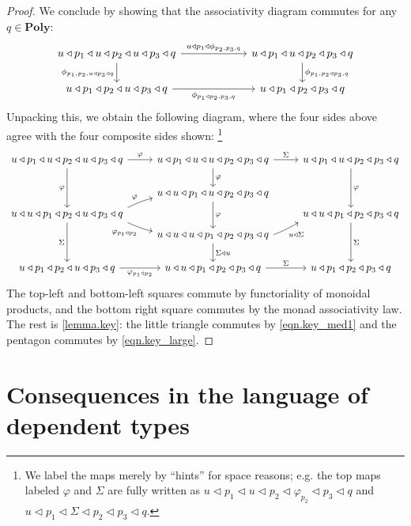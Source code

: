 \documentclass[11pt, one side, article]{memoir}
\theoremstyle{definition}
\theoremstyle{plain}
\newcommand{\Cat}[1]{\mathbf{#1}}%
\newcommand{\poly}{\Cat{Poly}}
\newcommand{\0}{\textsf{0}}
\newcommand{\1}{\tn{\textsf{1}}}
\newcommand{\tri}{\mathbin{\triangleleft}}
\begin{document}
\begin{proof}
We conclude by showing that the associativity diagram commutes for any $q\in\poly$:
\[
\begin{tikzcd}[ampersand replacement=\&, column sep=60pt]
	u\tri p_1\tri u\tri p_2\tri u\tri p_3\tri q
		\ar[r, "u\tri p_1\tri\phi_{p_2,p_3,q}"]
		\ar[d, "\phi_{p_1,p_2,u\tri p_3\tri q}"']\&
	u\tri p_1\tri u\tri p_2\tri p_3\tri q
		\ar[d, "\phi_{p_1,p_2\tri p_3,q}"]\\
	u\tri p_1\tri p_2\tri u\tri p_3\tri q
		\ar[r, "\phi_{p_1\tri p_2,p_3,q}"']\&
	u\tri p_1\tri p_2\tri p_3\tri q
\end{tikzcd}
\]
Unpacking this, we obtain the following diagram, where the four sides above agree with the four composite sides shown:%
\footnote{We label the maps merely by ``hints'' for space reasons; e.g. the top maps labeled $\varphi$ and $\Sigma$ are fully written as $u\tri p_1\tri u\tri p_2\tri\varphi_{p_2}\tri p_3\tri q$ and $u\tri p_1\tri\Sigma\tri p_2\tri p_3\tri q$.}
\[%
\begin{tikzcd}
	u\tri p_1\tri u\tri p_2\tri u\tri p_3\tri q\ar[r, "\varphi"]\ar[dd, "\varphi"']&
	u\tri p_1\tri u\tri u\tri p_2\tri p_3\tri q\ar[r, "\Sigma"]\ar[d, "\varphi"]&
	u\tri p_1\tri u\tri p_2\tri p_3\tri q\ar[dd, "\varphi"]\\&
	u\tri u\tri p_1\tri u\tri p_2\tri p_3\tri q\ar[dd, "\varphi"]\\[-12pt]
	u\tri u\tri p_1\tri p_2\tri u\tri p_3\tri q\ar[dd, "\Sigma"']\ar[ur, bend left=5pt, start anchor={north east}, "\varphi"]\ar[dr, bend right=5pt, start anchor={south east}, "\varphi_{p_1\tri p_2}"']&&
	u\tri u\tri p_1\tri p_2\tri p_3\tri q\ar[dd, "\Sigma"]\\[-12pt]&
	u\tri u\tri u\tri p_1\tri p_2\tri p_3\tri q\ar[d, "\Sigma\tri u"]\ar[ur, bend right=5pt, start anchor={east}, end anchor={south west}, "u\tri\Sigma"']\\
	u\tri p_1\tri p_2\tri u\tri p_3\tri q\ar[r, "\varphi_{p_1\tri p_2}"']&
	u\tri u\tri p_1\tri p_2\tri p_3\tri q\ar[r, "\Sigma"]&
	u\tri p_1\tri p_2\tri p_3\tri q
\end{tikzcd}
\]
The top-left and bottom-left squares commute by functoriality of monoidal products, and the bottom right square commutes by the monad associativity law. The rest is \cref{lemma.key}: the little triangle commutes by \eqref{eqn.key_med1} and the pentagon commutes by \eqref{eqn.key_large}.
\end{proof}


\chapter{Consequences in the language of dependent types}
\end{document}
